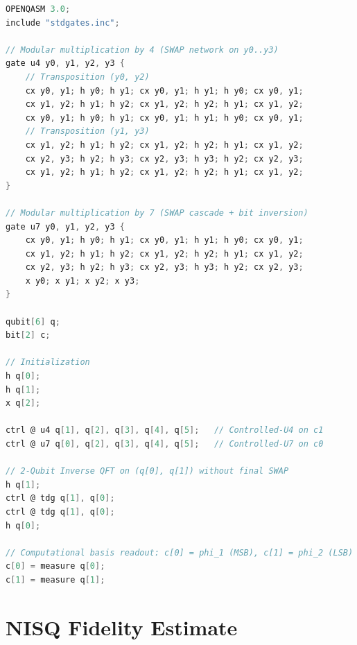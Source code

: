 \documentclass[11pt,a4paper,twocolumn]{article}
\begin{document}
\begin{lstlisting}[language=C, caption={Hand-structured OpenQASM 3.0 circuit equivalent to the full-register \texttt{|BF>} Shor program.}]
OPENQASM 3.0;
include "stdgates.inc";

// Modular multiplication by 4 (SWAP network on y0..y3)
gate u4 y0, y1, y2, y3 {
    // Transposition (y0, y2)
    cx y0, y1; h y0; h y1; cx y0, y1; h y1; h y0; cx y0, y1;
    cx y1, y2; h y1; h y2; cx y1, y2; h y2; h y1; cx y1, y2;
    cx y0, y1; h y0; h y1; cx y0, y1; h y1; h y0; cx y0, y1;
    // Transposition (y1, y3)
    cx y1, y2; h y1; h y2; cx y1, y2; h y2; h y1; cx y1, y2;
    cx y2, y3; h y2; h y3; cx y2, y3; h y3; h y2; cx y2, y3;
    cx y1, y2; h y1; h y2; cx y1, y2; h y2; h y1; cx y1, y2;
}

// Modular multiplication by 7 (SWAP cascade + bit inversion)
gate u7 y0, y1, y2, y3 {
    cx y0, y1; h y0; h y1; cx y0, y1; h y1; h y0; cx y0, y1;
    cx y1, y2; h y1; h y2; cx y1, y2; h y2; h y1; cx y1, y2;
    cx y2, y3; h y2; h y3; cx y2, y3; h y3; h y2; cx y2, y3;
    x y0; x y1; x y2; x y3;
}

qubit[6] q;
bit[2] c;

// Initialization
h q[0];
h q[1];
x q[2];

ctrl @ u4 q[1], q[2], q[3], q[4], q[5];   // Controlled-U4 on c1
ctrl @ u7 q[0], q[2], q[3], q[4], q[5];   // Controlled-U7 on c0

// 2-Qubit Inverse QFT on (q[0], q[1]) without final SWAP
h q[1];
ctrl @ tdg q[1], q[0];
ctrl @ tdg q[1], q[0];
h q[0];

// Computational basis readout: c[0] = phi_1 (MSB), c[1] = phi_2 (LSB)
c[0] = measure q[0];
c[1] = measure q[1];
\end{lstlisting}

\section{NISQ Fidelity Estimate}
\end{document}
